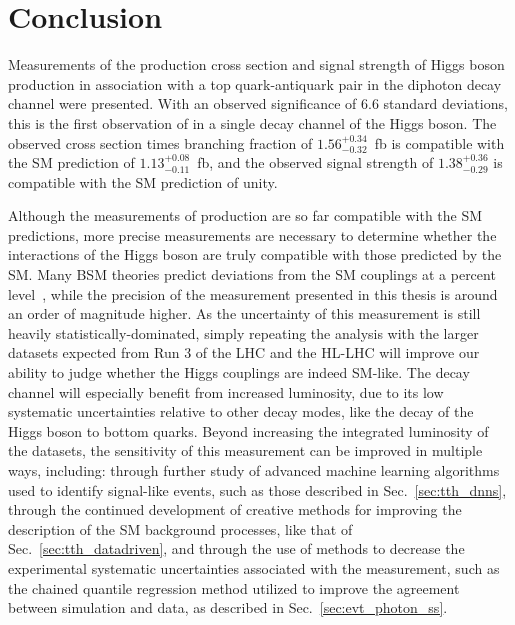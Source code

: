 \chapter{Conclusion} \label{chap:conclusion}

Measurements of the production cross section and signal strength of Higgs boson production in association with a top quark-antiquark pair in the diphoton decay channel were presented.
With an observed significance of 6.6 standard deviations, this is the first observation of \ttH in a single decay channel of the Higgs boson.
The observed cross section times branching fraction of $1.56^{+0.34}_{-0.32}$~fb is compatible with the SM prediction of $1.13^{+0.08}_{-0.11}$~fb, and the observed signal strength of $1.38^{+0.36}_{-0.29}$ is compatible with the SM prediction of unity.

Although the measurements of \ttH production are so far compatible with the SM predictions, more precise measurements are necessary to determine whether the interactions of the Higgs boson are truly compatible with those predicted by the SM.
Many BSM theories predict deviations from the SM couplings at a percent level~\cite{Dawson:2013bba}, while the precision of the measurement presented in this thesis is around an order of magnitude higher.
As the uncertainty of this measurement is still heavily statistically-dominated, simply repeating the analysis with the larger datasets expected from Run 3 of the LHC and the HL-LHC will improve our ability to judge whether the Higgs couplings are indeed SM-like.
The \Hgg decay channel will especially benefit from increased luminosity, due to its low systematic uncertainties relative to other decay modes, like the decay of the Higgs boson to bottom quarks.
Beyond increasing the integrated luminosity of the datasets, the sensitivity of this measurement can be improved in multiple ways, including:
through further study of advanced machine learning algorithms used to identify signal-like events, such as those described in Sec.~\ref{sec:tth_dnns},
through the continued development of creative methods for improving the description of the SM background processes, like that of Sec.~\ref{sec:tth_datadriven},
and through the use of methods to decrease the experimental systematic uncertainties associated with the measurement, such as the chained quantile regression method utilized to improve the agreement between simulation and data, as described in Sec.~\ref{sec:evt_photon_ss}.

